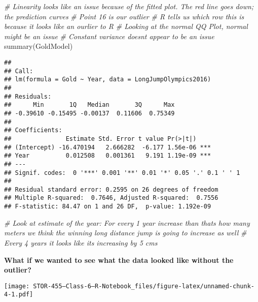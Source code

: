 \documentclass[
]{article}
\newenvironment{Shaded}{\begin{snugshade}}{\end{snugshade}}
\newcommand{\CommentTok}[1]{\textcolor[rgb]{0.56,0.35,0.01}{\textit{#1}}}
\newcommand{\FunctionTok}[1]{\textcolor[rgb]{0.00,0.00,0.00}{#1}}
\newcommand{\NormalTok}[1]{#1}
\newcommand{\SpecialCharTok}[1]{\textcolor[rgb]{0.00,0.00,0.00}{#1}}
\begin{document}
\begin{Shaded}
\begin{Highlighting}[]
\CommentTok{\# Linearity looks like an issue because of the fitted plot.  The red line goes down; the prediction curves }
\CommentTok{\# Point 16 is our outlier }
\CommentTok{\# R tells us which row this is because it looks like an ourlier to R }
\CommentTok{\# Looking at the normal QQ Plot, normal might be an issue }
\CommentTok{\# Constant variance doesn\textquotesingle{}t appear to be an issue }
\FunctionTok{summary}\NormalTok{(GoldModel)}
\end{Highlighting}
\end{Shaded}

\begin{verbatim}
## 
## Call:
## lm(formula = Gold ~ Year, data = LongJumpOlympics2016)
## 
## Residuals:
##      Min       1Q   Median       3Q      Max 
## -0.39610 -0.15495 -0.00137  0.11606  0.75349 
## 
## Coefficients:
##               Estimate Std. Error t value Pr(>|t|)    
## (Intercept) -16.470194   2.666282  -6.177 1.56e-06 ***
## Year          0.012508   0.001361   9.191 1.19e-09 ***
## ---
## Signif. codes:  0 '***' 0.001 '**' 0.01 '*' 0.05 '.' 0.1 ' ' 1
## 
## Residual standard error: 0.2595 on 26 degrees of freedom
## Multiple R-squared:  0.7646, Adjusted R-squared:  0.7556 
## F-statistic: 84.47 on 1 and 26 DF,  p-value: 1.192e-09
\end{verbatim}

\begin{Shaded}
\begin{Highlighting}[]
\CommentTok{\# Look at estimate of the year: For every 1 year increase than that\textquotesingle{}s how many meters we think the winning long distance jump is going to increase as well }
\CommentTok{\# Every 4 years it looks like its increasing by 5 cms}
\end{Highlighting}
\end{Shaded}

\textbf{What if we wanted to see what the data looked like without the
outlier?}

\begin{Shaded}
\end{Shaded}

\texttt{[image: STOR-455---Class-6---R-Notebook\_files/figure-latex/unnamed-chunk-4-1.pdf]}
\end{document}
